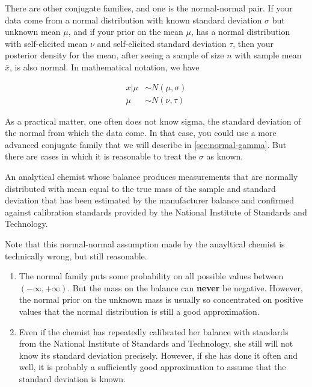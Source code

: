 \documentclass[]{book}
\theoremstyle{definition}
\theoremstyle{definition}
\theoremstyle{remark}
\let\BeginKnitrBlock\begin \let\EndKnitrBlock\end
\begin{document}
There are other conjugate families, and one is the normal-normal pair.
If your data come from a normal distribution with known standard
deviation \(\sigma\) but unknown mean \(\mu\), and if your prior on the
mean \(\mu\), has a normal distribution with self-elicited mean \(\nu\)
and self-elicited standard deviation \(\tau\), then your posterior
density for the mean, after seeing a sample of size \(n\) with sample
mean \(\bar{x}\), is also normal. In mathematical notation, we have

\[\begin{aligned}
x|\mu &\sim N(\mu,\sigma) \\
\mu &\sim N(\nu, \tau)
\end{aligned}\]

As a practical matter, one often does not know sigma, the standard
deviation of the normal from which the data come. In that case, you
could use a more advanced conjugate family that we will describe in
\ref{sec:normal-gamma}. But there are cases in which it is reasonable to
treat the \(\sigma\) as known.

\BeginKnitrBlock{example}
\protect\hypertarget{ex:chemist}{}{\label{ex:chemist}}An analytical chemist
whose balance produces measurements that are normally distributed with
mean equal to the true mass of the sample and standard deviation that
has been estimated by the manufacturer balance and confirmed against
calibration standards provided by the National Institute of Standards
and Technology.

Note that this normal-normal assumption made by the anayltical chemist
is technically wrong, but still reasonable.

\begin{enumerate}
\def\labelenumi{\arabic{enumi}.}
\item
  The normal family puts some probability on all possible values between
  \((-\infty,+\infty)\). But the mass on the balance can \textbf{never}
  be negative. However, the normal prior on the unknown mass is usually
  so concentrated on positive values that the normal distribution is
  still a good approximation.
\item
  Even if the chemist has repeatedly calibrated her balance with
  standards from the National Institute of Standards and Technology, she
  still will not know its standard deviation precisely. However, if she
  has done it often and well, it is probably a sufficiently good
  approximation to assume that the standard deviation is known.
\end{enumerate}
\EndKnitrBlock{example}
\end{document}
